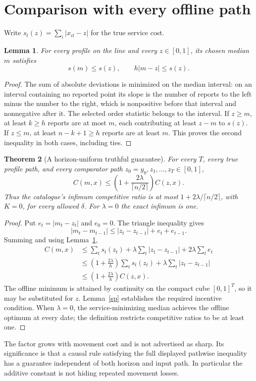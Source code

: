 \documentclass[11pt]{article}
\newtheorem{theorem}{Theorem}
\newtheorem{lemma}[theorem]{Lemma}
\theoremstyle{definition}
\begin{document}
\section{Comparison with every offline path}
Write $s_t(z)=\sum_i|x_{it}-z|$ for the true service cost.
\begin{lemma}\label{distance}
For every profile on the line and every $z\in[0,1]$, its chosen median
$m$ satisfies
\[
 s(m)\le s(z),\qquad h|m-z|\le s(z).
\]
\end{lemma}
\begin{proof}
The sum of absolute deviations is minimized on the median interval: on
an interval containing no reported point its slope is the number of
reports to the left minus the number to the right, which is nonpositive
before that interval and nonnegative after it. The selected order
statistic belongs to the interval. If $z\ge m$, at least $k\ge h$ reports
are at most $m$, each contributing at least $z-m$ to $s(z)$. If $z\le m$,
at least $n-k+1\ge h$ reports are at least $m$. This proves the second
inequality in both cases, including ties.
\end{proof}
\begin{theorem}[A horizon-uniform truthful guarantee]\label{competitive}
For every $T$, every true profile path, and every comparator path
$z_0=y_0,z_1,\ldots,z_T\in[0,1]$,
\[
 C(m,x)\le
 \left(1+\frac{2\lambda}{\lceil n/2\rceil}\right)C(z,x).
\]
Thus the catalogue's infimum competitive ratio is at most
$1+2\lambda/\lceil n/2\rceil$, with $K=0$, for every allowed $\delta$.
For $\lambda=0$ the exact infimum is one.
\end{theorem}
\begin{proof}
Put $e_t=|m_t-z_t|$ and $e_0=0$. The triangle inequality gives
\[
 |m_t-m_{t-1}|\le |z_t-z_{t-1}|+e_t+e_{t-1}.
\]
Summing and using Lemma~\ref{distance},
\begin{align*}
 C(m,x)&\le \sum_t s_t(z_t)+\lambda\sum_t|z_t-z_{t-1}|
                   +2\lambda\sum_t e_t\\
 &\le \left(1+\frac{2\lambda}{h}\right)\sum_t s_t(z_t)
                   +\lambda\sum_t|z_t-z_{t-1}|\\
 &\le \left(1+\frac{2\lambda}{h}\right)C(z,x).
\end{align*}
The offline minimum is attained by continuity on the compact cube
$[0,1]^T$, so it may be substituted for $z$. Lemma~\ref{sp} establishes
the required incentive condition. When $\lambda=0$, the service-minimizing
median achieves the offline optimum at every date; the definition restricts
competitive ratios to be at least one.
\end{proof}
The factor grows with movement cost and is not advertised as sharp.
Its significance is that a causal rule satisfying the full displayed
pathwise inequality has a guarantee independent of both horizon and
input path. In particular the additive constant is not hiding repeated
movement losses.
\end{document}

